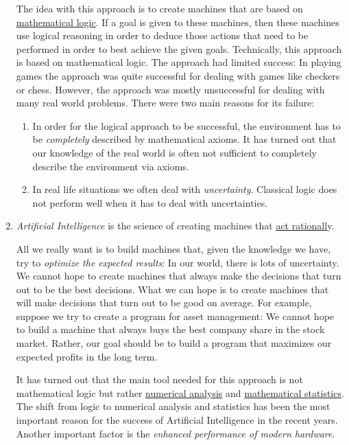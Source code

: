 \begin{enumerate}
      The idea with this approach is to create machines that are based on 
      \href{https://en.wikipedia.org/wiki/Mathematical_logic}{mathematical logic}.  If a
      goal is given to these machines, then these machines use logical reasoning in order to deduce
      those actions that need to be performed in order to best achieve the given goals. Technically,
      this approach is based on mathematical logic.  The approach had limited success:  In playing
      games the approach was quite successful for dealing with games like checkers or chess.
      However, the approach was mostly unsuccessful for dealing with many real world problems.
      There were two main reasons for its failure:
      \begin{enumerate}
      \item In order for the logical approach to be successful, the environment has to be
            \emph{\color{blue}completely} 
            described by mathematical axioms.  It has turned out that our knowledge of the real
            world is often not sufficient to completely describe the environment via axioms.  
      \item In real life situations we often deal with \emph{\color{blue}uncertainty}.  Classical logic does not
            perform well when it has to deal with  uncertainties.
      \end{enumerate}
\item \emph{Artificial Intelligence} is the science of creating machines that \underline{act rationall}y.

      All we really want is to build machines that, given the knowledge we have, try to 
      \emph{\color{blue}optimize the expected results}:  In our world, there is lots of uncertainty.  We cannot
      hope to create 
      machines that always make the decisions that turn out to be the best decisions.  What we can
      hope is to create machines that will make decisions that turn out to be good on average.  For
      example, suppose we try to create a program for asset management:  We cannot hope to build a
      machine that always buys the best company share in the stock market.  Rather, our goal should
      be to build a program that maximizes our expected profits in the long term.

      It has turned out that the main tool needed for this approach is not mathematical logic but
      rather \href{https://en.wikipedia.org/wiki/Numerical_analysis}{numerical analysis} and
      \href{https://en.wikipedia.org/wiki/Mathematical_statistics}{mathematical statistics}.  The shift 
      from logic to numerical analysis and statistics has been the most important reason for the success of
      Artificial Intelligence in the recent years.  Another important factor is the 
      \emph{\color{blue}enhanced performance of modern hardware}. 
\end{enumerate}
